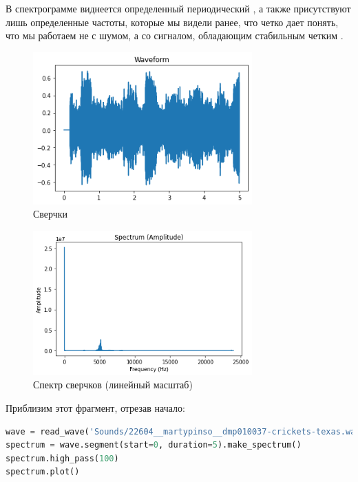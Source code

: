 \documentclass[a4paper,12pt]{report}
\begin{document}
    В спектрограмме виднеется определенный периодический , а также присутствуют лишь определенные частоты, которые мы видели ранее, что четко дает понять, что мы работаем не с шумом, а со сигналом, обладающим стабильным четким .
    
    \begin{figure}[H]
        \centering
        \includegraphics[width=0.75\textwidth]{ex1_crickets_wave.png}
        \caption{Сверчки}
        \label{fig:ex1_crickets_wave}
    \end{figure}
    
    \begin{figure}[H]
        \centering
        \includegraphics[width=0.75\textwidth]{ex1_crickets_spectrum_amplitude.png}
        \caption{Спектр сверчков (линейный масштаб)}
        \label{fig:ex1_crickets_spectrum_amplitude}
    \end{figure}
    
    Приблизим этот фрагмент, отрезав начало:
    
\begin{lstlisting}[language=Python,caption=Смотрим ближе]
wave = read_wave('Sounds/22604__martypinso__dmp010037-crickets-texas.wav')
spectrum = wave.segment(start=0, duration=5).make_spectrum()
spectrum.high_pass(100)
spectrum.plot()
\end{lstlisting}
    
\end{document}
